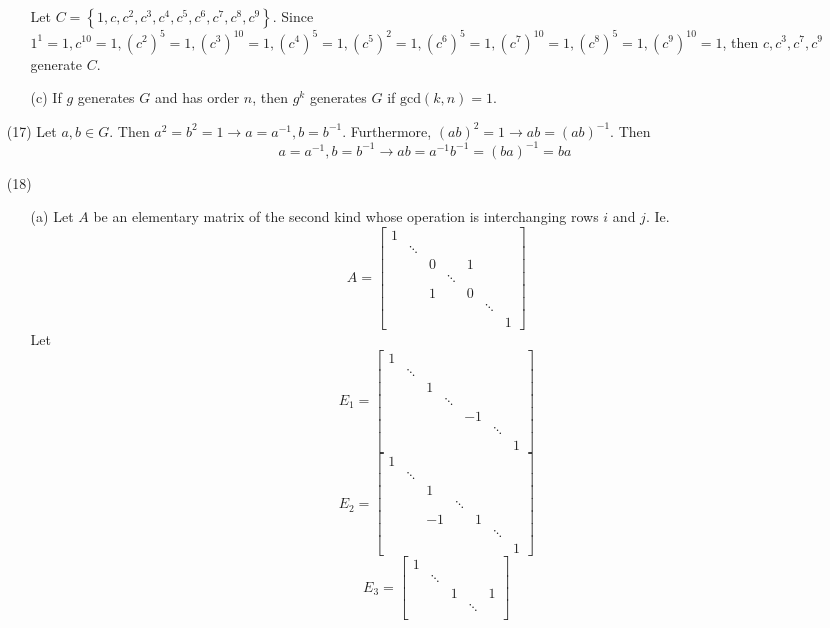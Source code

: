 \documentclass[12pt]{article}
\begin{document}
\begin{itemize}
\begin{itemize}
Let $C = \left\lbrace 1, c, c^2, c^3, c^4, c^5, c^6, c^7, c^8, c^9 \right\rbrace$. Since $1^1 = 1, c^{10} = 1, (c^2)^5 = 1, (c^3)^{10} = 1, (c^4)^5 = 1, (c^5)^2 = 1, (c^6)^5 = 1, (c^7)^{10} = 1, (c^8)^5 = 1, (c^9)^{10} = 1$, then $c, c^3, c^7, c^9$ generate $C$.
\item[(c)] If $g$ generates $G$ and has order $n$, then $g^k$ generates $G$ if $\text{gcd}(k, n) = 1$.
\end{itemize}
\item[(17)]
Let $a, b \in G$. Then $a^2 = b^2 = 1 \rightarrow a = a^{-1}, b = b^{-1}$. Furthermore, $(ab)^2 = 1 \rightarrow ab = (ab)^{-1}$. Then
$$a = a^{-1}, b = b^{-1} \rightarrow ab = a^{-1}b^{-1} = (ba)^{-1} = ba$$
\item[(18)]
\begin{itemize}
\item[(a)]
Let $A$ be an elementary matrix of the second kind whose operation is interchanging rows $i$ and $j$. Ie.
$$A = \begin{bmatrix}
1 \\
& \ddots \\
& & 0 & & 1 \\
& & & \ddots \\
& & 1 & & 0 \\
& & & & & \ddots \\
& & & & & & 1
\end{bmatrix}$$
Let
$$E_1 = \begin{bmatrix}
1 \\
& \ddots \\
& & 1 \\
& & & \ddots \\
& & & & -1 \\
& & & & & \ddots \\
& & & & & & 1
\end{bmatrix}$$
$$E_2 = \begin{bmatrix}
1 \\
& \ddots \\
& & 1 \\
& & & \ddots \\
& & -1 & & 1 \\
& & & & & \ddots \\
& & & & & & 1
\end{bmatrix}$$
$$E_3 = \begin{bmatrix}
1 \\
& \ddots \\
& & 1 & & 1 \\
& & & \ddots \\

\end{bmatrix}$$
\end{itemize}
\end{itemize}
\end{document}
